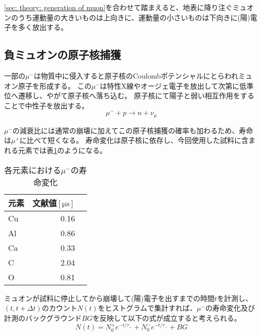 \documentclass[dvipdfmx]{jsarticle}
\begin{document}
\ref{sec: theory: generation of muon}を合わせて踏まえると、地表に降り注ぐミュオンのうち運動量の大きいものは上向きに、運動量の小さいものは下向きに(陽)電子を多く放出する。


\subsection{負ミュオンの原子核捕獲}

一部の$\mu^-$は物質中に侵入すると原子核のCoulombポテンシャルにとらわれミュオン原子を形成する。
この$\mu^-$は特性X線やオージェ電子を放出して次第に低準位へ遷移し、やがて原子核へ落ち込む。
原子核にて陽子と弱い相互作用をすることで中性子を放出する。
\begin{equation*}
    \mu^-+p\to n+\nu_\mu
\end{equation*}

$\mu^-$の減衰比には通常の崩壊に加えてこの原子核捕獲の確率も加わるため、寿命は$\mu^+$に比べて短くなる。
寿命変化は原子核に依存し、今回使用した試料に含まれる元素では表\ref{table: life of muon}のようになる\cite{Ito Kaji Tabata Yoshiwara}。

\begin{table}
    \centering
    \caption{各元素における$\mu^-$の寿命変化}
    \begin{tabular}{lrr}
        \toprule
        元素 & 文献値$[\unit{\micro\second}]$
        \\
        \midrule
        Cu & 0.16
        \\
        Al & 0.86
        \\
        Ca & 0.33
        \\
        C & 2.04
        \\
        O & 0.81
        \\
        \bottomrule
    \end{tabular}
    \label{table: life of muon}
\end{table}


ミュオンが試料に停止してから崩壊して(陽)電子を出すまでの時間$t$を計測し、$(t,t+\Delta t)$のカウント$N(t)$をヒストグラムで集計すれば、$\mu^-$の寿命変化及び計測のバックグラウンド$BG$を反映して以下の式が成立すると考えられる。
\begin{equation}
    \label{eq: N of t considering different tau and BG}
    N(t)
    =
    N_0^+e^{-t/\tau_+}
    +
    N_0^-e^{-t/\tau_-}
    +
    BG
\end{equation}
\end{document}
